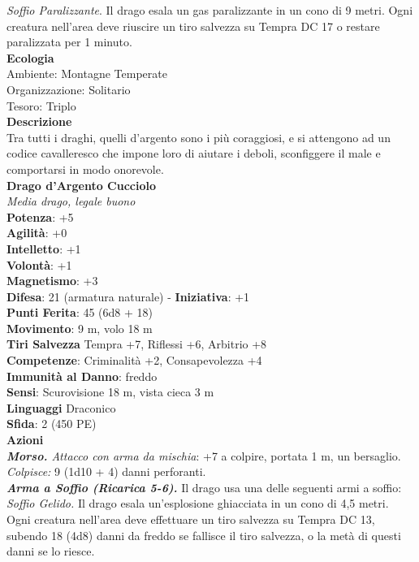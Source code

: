 \begin{multicols}{2}
\emph{Soffio Paralizzante}. Il drago esala un gas paralizzante in un cono di 9 metri. Ogni creatura nell'area deve riuscire un tiro salvezza su Tempra DC 17 o restare paralizzata per 1 minuto.\\
\textbf{Ecologia}\\
Ambiente: Montagne Temperate\\
Organizzazione: Solitario\\
Tesoro: Triplo\\
\textbf{Descrizione}\\
Tra tutti i draghi, quelli d’argento sono i più coraggiosi, e si attengono ad un codice cavalleresco che impone loro di aiutare i deboli, sconfiggere il male e comportarsi in modo onorevole.\\
\medskip\textbf{Drago d'Argento Cucciolo}\\
\emph{Media drago, legale buono}\\
\textbf{Potenza}: +5\\
\textbf{Agilità}: +0\\
\textbf{Intelletto}: +1\\
\textbf{Volontà}: +1\\
\textbf{Magnetismo}: +3\\
\textbf{Difesa}: 21 (armatura naturale) - \textbf{Iniziativa}: +1\\
\textbf{Punti Ferita}: 45 (6d8 + 18)\\
\textbf{Movimento}: 9 m, volo 18 m\\
\textbf{Tiri Salvezza} Tempra +7, Riflessi +6, Arbitrio +8\\
\textbf{Competenze}: Criminalità +2, Consapevolezza +4\\
\textbf{Immunità al Danno}: freddo\\
\textbf{Sensi}: Scurovisione 18 m, vista cieca 3 m\\
\textbf{Linguaggi} Draconico\\
\textbf{Sfida}: 2 (450 PE)\smallskip\\
\smallskip\textbf{Azioni}\\
\emph{\textbf{Morso.} Attacco con arma da mischia}: +7 a colpire, portata 1 m, un bersaglio.\\
\emph{Colpisce:} 9 (1d10 + 4) danni perforanti.\\
\emph{\textbf{Arma a Soffio (Ricarica 5-6).}} Il drago usa una delle seguenti armi a soffio:\\
\emph{Soffio Gelido.} Il drago esala un'esplosione ghiacciata in un cono di 4,5 metri. Ogni creatura nell'area deve effettuare un tiro salvezza su Tempra DC 13, subendo 18 (4d8) danni da freddo se fallisce il tiro salvezza, o la metà di questi danni se lo riesce.\\

\end{multicols}
